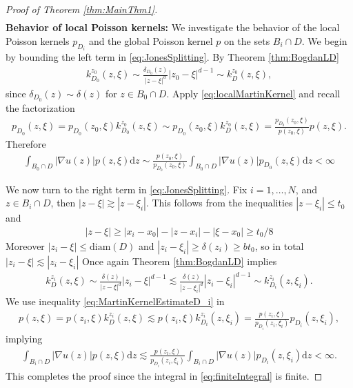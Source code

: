 \documentclass[10pt,a4paper]{amsart}
\begin{document}
\begin{proof}[Proof of Theorem \ref{thm:MainThm1}]
\begin{align}
		\end{align}
		\textbf{Behavior of local Poisson kernels:} We investigate the behavior of the local Poisson kernels $p_{D_i}$ and the global Poisson kernel $p$ on the sets $B_i\cap D$. We begin by bounding the left term in \eqref{eq:JonesSplitting}.
	 	By Theorem \ref{thm:BogdanLD}
		\begin{align}\label{eq:localMartinKernel}
			k^{z_0}_{D_0}(z,\xi)\sim\frac{\delta_{D_0}(z)}{|z-\xi|^d}|z_0-\xi|^{d-1}\sim k^{z_0}_{D}(z,\xi),
		\end{align}
		since $\delta_{D_0}(z)\sim\delta(z)$ for $z\in B_0\cap D$.
		Apply \eqref{eq:localMartinKernel} and recall the factorization 
		\begin{align*}
			p_{D_0}(z,\xi)=p_{D_0}(z_0,\xi) k^{z_0}_{D_0}(z,\xi)\sim p_{D_0}(z_0,\xi)k^{z_0}_{D}(z,\xi) = \frac{p_{D_0}(z_0,\xi)}{p(z_0,\xi)} p(z,\xi).
		\end{align*} 
		Therefore 
		\begin{align}
			\int_{B_0\cap D}|\nabla u(z)|p(z,\xi)\mathrm dz \sim \frac{p(z_0,\xi)}{p_{D_0}(z_0,\xi)} \int_{B_0\cap D}|\nabla u(z)|p_{D_0}(z,\xi)\mathrm dz<\infty
		\end{align}
		
		We now turn to the right term in \eqref{eq:JonesSplitting}. Fix $i=1,\dots,N$, and $z\in B_i\cap D$, then $|z-\xi|\gtrsim|z-\xi_i|$. This follows from the inequalities $|z-\xi_i|\leq t_0$ and 
		\begin{align}
			|z-\xi|\geq|x_i-x_0|-|z-x_i|-|\xi-x_0|\geq t_0/8
		\end{align}
		Moreover $|z_i-\xi|\leq\mathrm{diam}(D)$ and $|z_i-\xi_i|\geq\delta(z_i)\geq b t_0$, so in total $|z_i-\xi|\lesssim|z_i-\xi_i|$ Once again Theorem \ref{thm:BogdanLD} implies
		\begin{align}\label{eq:MartinKernelEstimateD_i}
			k_{D}^{z_i}(z,\xi)\sim\frac{\delta(z)}{|z-\xi|^d}|z_i-\xi|^{d-1}\lesssim \frac{\delta(z)}{|z-\xi_i|^d}|z_i-\xi_i|^{d-1}\sim k_{D_i}^{z_i}(z,\xi_i).
		\end{align}
		We use inequality \eqref{eq:MartinKernelEstimateD_i} in
		\begin{align*}
			p(z,\xi)=p(z_i,\xi) k^{z_i}_{D}(z,\xi)\lesssim p(z_i,\xi)k^{z_i}_{ D_i}(z,\xi_i) = \frac{p(z_i,\xi)}{p_{D_i}(z_i,\xi_i)} p_{D_i}(z,\xi_i),
		\end{align*}
		implying 
		\begin{align}
			\int_{B_i\cap D}|\nabla u(z)|p(z,\xi)\mathrm dz\lesssim \frac{p(z_i,\xi)}{p_{D_i}(z_i,\xi_i)}\int_{B_i\cap D}|\nabla u(z)|p_{D_i}(z,\xi_i)\mathrm dz<\infty.
		\end{align}
		This completes the proof since the integral in \eqref{eq:finiteIntegral} is finite.
	\end{proof}
\end{document}
